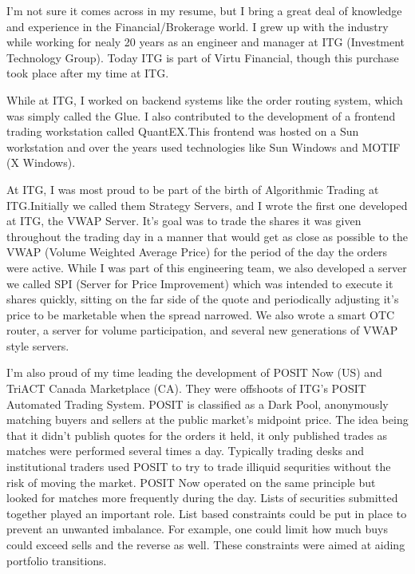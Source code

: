 \documentclass[11pt, letterpaper]{awesome-cv}
\begin{document}
\begin{cvletter}
I'm not sure it comes across in my resume, but I bring a great deal of
knowledge and experience in the Financial/Brokerage world.  I grew up
with the industry while working for nealy 20 years as an engineer and
manager at ITG (Investment Technology Group).  Today ITG is part of
Virtu Financial, though this purchase took place after my time at ITG.

While at ITG, I worked on backend systems like the order routing
system, which was simply called the Glue.  I also contributed to the
development of a frontend trading workstation called QuantEX.\@ This
frontend was hosted on a Sun workstation and over the years used
technologies like Sun Windows and MOTIF (X Windows).

At ITG, I was most proud to be part of the birth of Algorithmic
Trading at ITG.\@ Initially we called them Strategy Servers, and I
wrote the first one developed at ITG, the VWAP Server.  It's goal was
to trade the shares it was given throughout the trading day in a
manner that would get as close as possible to the VWAP (Volume
Weighted Average Price) for the period of the day the orders were
active.  While I was part of this engineering team, we also developed
a server we called SPI (Server for Price Improvement) which was
intended to execute it shares quickly, sitting on the far side of the
quote and periodically adjusting it's price to be marketable when the
spread narrowed.  We also wrote a smart OTC router, a server for
volume participation, and several new generations of VWAP style
servers.

I'm also proud of my time leading the development of POSIT Now (US)
and TriACT Canada Marketplace (CA).  They were offshoots of ITG's
POSIT Automated Trading System.  POSIT is classified as a Dark Pool,
anonymously matching buyers and sellers at the public market's
midpoint price.  The idea being that it didn't publish quotes for the
orders it held, it only published trades as matches were performed
several times a day.  Typically trading desks and institutional
traders used POSIT to try to trade illiquid sequrities without the
risk of moving the market.  POSIT Now operated on the same principle
but looked for matches more frequently during the day.  Lists of
securities submitted together played an important role.  List based
constraints could be put in place to prevent an unwanted imbalance.
For example, one could limit how much buys could exceed sells and the
reverse as well.  These constraints were aimed at aiding portfolio
transitions.


\end{cvletter}
\end{document}
